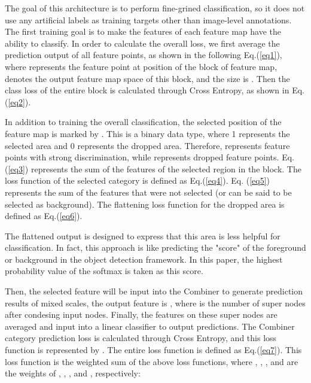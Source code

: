 \documentclass[conference]{IEEEtran}
\begin{document}
The goal of this architecture is to perform fine-grined classification, so it does not use any artificial labels as training targets other than image-level annotations. The first training goal is to make the features of each feature map  have the ability to classify. In order to calculate the overall loss, we first average the prediction output of all feature points, as shown in the following Eq.(\ref{eq1}), where  represents the feature point at position  of the  block of feature map,  denotes the output feature map space of this block, and the size is . Then the class loss of the entire block is calculated through Cross Entropy, as shown in Eq.(\ref{eq2}).





In addition to training the overall classification, the selected position of the feature map is marked by . This  is a binary data type, where 1 represents the selected area and 0 represents the dropped area. Therefore,  represents feature points with strong discrimination, while  represents dropped feature points. Eq. (\ref{eq3}) represents the sum of the features of the selected region in the  block. The loss function of the selected category is  defined as Eq.(\ref{eq4}). Eq. (\ref{eq5}) represents the sum of the features that were not selected (or can be said to be selected as background). The flattening loss function for the dropped area is  defined as Eq.(\ref{eq6}). 









The flattened output is designed to express that this area is less helpful for classification. In fact, this approach is like predicting the "score" of the foreground or background in the object detection framework. In this paper, the highest probability value of the softmax is taken as this score.

Then, the selected feature  will be input into the Combiner to generate prediction results of mixed scales, the output feature is ,  where  is the number of super nodes after condesing input nodes. Finally, the features on these super nodes are averaged and input into a linear classifier to output predictions. The Combiner category prediction loss is calculated through Cross Entropy, and this loss function is represented by . The entire loss function is defined as Eq.(\ref{eq7}). This loss function is the weighted sum of the above loss functions, where , , , and  are the weights of , , , and , respectively:
\end{document}
